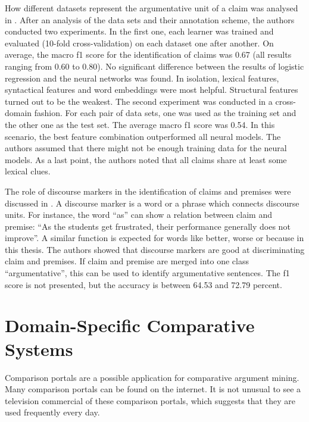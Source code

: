 How different datasets represent the argumentative unit of a claim was analysed in \cite{Daxenberger2017What-is-the-Ess}. After an analysis of the data sets and their annotation scheme, the authors conducted two experiments.
In the first one, each learner was trained and evaluated (10-fold cross-validation) on each dataset one after another. On average, the macro f1 score for the identification of claims was 0.67 (all results ranging from 0.60 to 0.80). No significant difference between the results of logistic regression and the neural networks was found. In isolation, lexical features, syntactical features and word embeddings were most helpful. Structural features turned out to be the weakest.
The second experiment was conducted in a cross-domain fashion. For each pair of data sets, one was used as the training set and the other one as the test set. The average macro f1 score was 0.54. In this scenario, the best feature combination outperformed all neural models. The authors assumed that there might not be enough training data for the neural models.
As a last point, the authors noted that all claims share at least some lexical clues.


The role of discourse markers in the identification of claims and premises were discussed in \cite{Eckle-Kohler2015On-the-Role-of-}. A discourse marker is a word or a phrase which connects discourse units. For instance, the word \enquote{as} can show a relation between claim and premise: \enquote{As the students get frustrated, their performance generally does not improve}.  A similar function is expected for words like better, worse or because in this thesis. The authors showed that discourse markers are good at discriminating claim and premises. If claim and premise are merged into one class \enquote{argumentative}, this can be used to identify argumentative sentences. The f1 score is not presented, but the accuracy is between 64.53 and 72.79 percent.



\section{Domain-Specific Comparative Systems}
\label{sec:domainspec}

Comparison portals are a possible application for comparative argument mining. Many comparison portals can be found on the internet. It is not unusual to see a television commercial of these comparison portals, which suggests that they are used frequently every day.

